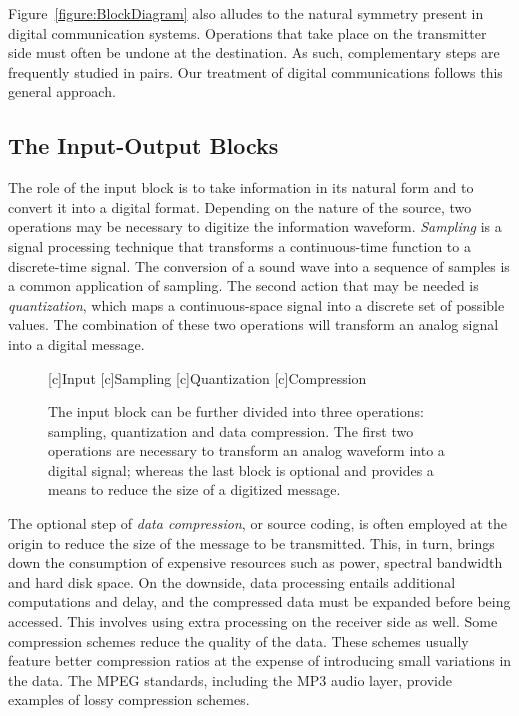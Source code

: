 Figure~\ref{figure:BlockDiagram} also alludes to the natural symmetry present in digital communication systems.
Operations that take place on the transmitter side must often be undone at the destination.
As such, complementary steps are frequently studied in pairs.
Our treatment of digital communications follows this general approach.


\subsection{The Input-Output Blocks}

The role of the input block is to take information in its natural form and to convert it into a digital format.
Depending on the nature of the source, two operations may be necessary to digitize the information waveform.
\emph{Sampling} is a signal processing technique that transforms a continuous-time function to a discrete-time signal.
The conversion of a sound wave into a sequence of samples is a common application of sampling.
The second action that may be needed is \emph{quantization}, which maps a continuous-space signal into a discrete set of possible values.
The combination of these two operations will transform an analog signal into a digital message.

\begin{figure}[htbp]
\begin{center}
\begin{psfrags}
[c]{Input}
[c]{Sampling}
[c]{Quantization}
[c]{Compression}
\end{psfrags}
\end{center}
\caption{The input block can be further divided into three operations: sampling, quantization and data compression.
The first two operations are necessary to transform an analog waveform into a digital signal; whereas the last block is optional and provides a means to reduce the size of a digitized message.}
\label{figure:BlockInput}
\end{figure}

The optional step of \emph{data compression}, or source coding, is often employed at the origin to reduce the size of the message to be transmitted.
This, in turn, brings down the consumption of expensive resources such as power, spectral bandwidth and hard disk space.
On the downside, data processing entails additional computations and delay, and the compressed data must be expanded before being accessed.
This involves using extra processing on the receiver side as well.
Some compression schemes reduce the quality of the data.
These schemes usually feature better compression ratios at the expense of introducing small variations in the data.
The MPEG standards, including the MP3 audio layer, provide examples of lossy compression schemes.

